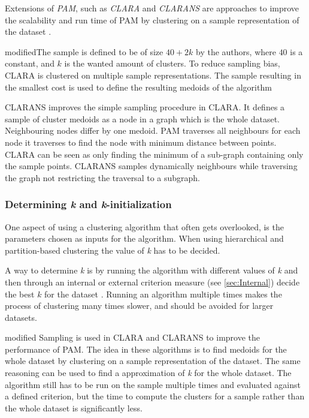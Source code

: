 \documentclass[../report.tex]{subfiles}
\begin{document}
Extensions of \textit{PAM}, such as \textit{CLARA} and \textit{CLARANS} are approaches to improve the scalability and run time of PAM by clustering on a sample representation of the dataset \cite{Ng2002}. \begin{color}{modified}The sample is defined to be of size $40 + 2k$ by the authors, where $40$ is a constant, and $k$ is the wanted amount of clusters. To reduce sampling bias, CLARA is clustered on multiple sample representations. The sample resulting in the smallest cost is used to define the resulting medoids of the algorithm \end{color} CLARANS improves the simple sampling procedure in CLARA. It defines a sample of cluster medoids as a node in a graph which is the whole dataset. Neighbouring nodes differ by one medoid. PAM traverses all neighbours for each node it traverses to find the node with minimum distance between points. CLARA can be seen as only finding the minimum of a sub-graph containing only the sample points. CLARANS samples dynamically neighbours while traversing the graph not restricting the traversal to a subgraph.

\subsubsection{Determining \textit{k} and \textit{k}-initialization}
One aspect of using a clustering algorithm that often gets overlooked, is the parameters chosen as inputs for the algorithm.
When using hierarchical and partition-based clustering the value of \textit{k} has to be decided.

A way to determine \textit{k} is by running the algorithm with different values of \textit{k} and then through an internal or external criterion measure (see \cref{sec:Internal}) decide the best $k$ for the dataset \cite{Huang97clusteringlarge, Sugar2003}. Running an algorithm multiple times makes the process of clustering many times slower, and should be avoided for larger datasets.

\begin{color}{modified}
Sampling is used in CLARA and CLARANS \cite{Ng2002} to improve the performance of PAM. The idea in these algorithms is to find medoids for the whole dataset by clustering on a sample representation of the dataset. The same reasoning can be used to find a approximation of \textit{k} for the whole dataset. The algorithm still has to be run on the sample multiple times and evaluated against a defined criterion, but the time to compute the clusters for a sample rather than the whole dataset is significantly less.
\end{color}
\end{document}
